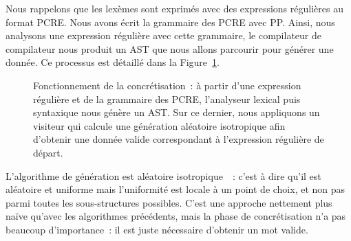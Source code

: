 Nous rappelons que les lexèmes sont exprimés avec des expressions régulières au
format PCRE. Nous avons écrit la grammaire des PCRE avec PP. Ainsi, nous
analysons une expression régulière avec cette grammaire, le compilateur de
compilateur nous produit un AST que nous allons parcourir pour générer une
donnée. Ce processus est détaillé dans la Figure~\ref{figure:data:regex}.
%
\begin{figure}


\caption{\label{figure:data:regex} Fonctionnement de la concrétisation~: à
partir d'une expression régulière et de la grammaire des PCRE, l'analyseur
lexical puis syntaxique nous génère un AST. Sur ce dernier, nous appliquons un
visiteur qui calcule une génération aléatoire isotropique afin d'obtenir une
donnée valide correspondant à l'expression régulière de départ.}

\end{figure}
%
L'algorithme de génération est aléatoire isotropique~~: c'est à
dire qu'il est aléatoire et uniforme mais l'uniformité est locale à un point de
choix, et non pas parmi toutes les sous-structures possibles. C'est une approche
nettement plus naïve qu'avec les algorithmes précédents, mais la phase de
concrétisation n'a pas beaucoup d'importance~: il est juste nécessaire d'obtenir
un mot valide.

